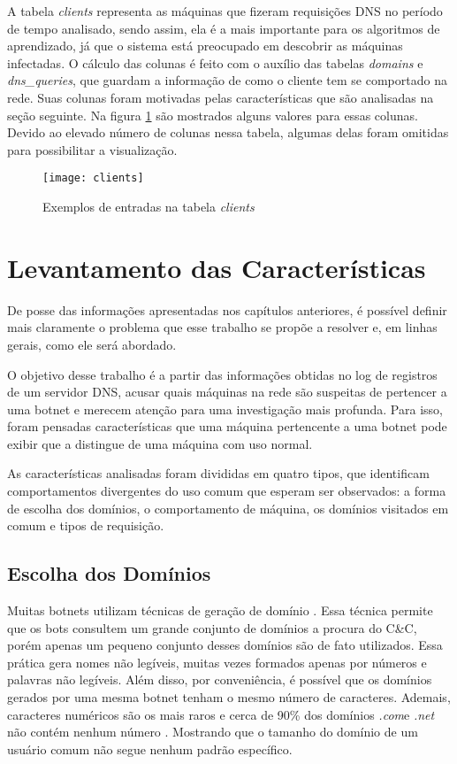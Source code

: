 A tabela \textit{clients} representa as máquinas que fizeram requisições DNS no período de tempo analisado, sendo assim, ela é a mais importante para os algoritmos de aprendizado, já que o sistema está preocupado em descobrir as máquinas infectadas. O cálculo das colunas é feito com o auxílio das tabelas \textit{domains} e \textit{dns\_queries}, que guardam a informação de como o cliente tem se comportado na rede. Suas colunas foram motivadas pelas características que são analisadas na seção seguinte. Na figura \ref{fig:clients} são mostrados alguns valores para essas colunas. Devido ao elevado número de colunas nessa tabela, algumas delas foram omitidas para possibilitar a visualização.

\begin{figure}
\texttt{[image: clients]}
\caption[Exemplos de entradas na tabela \textit{clients}]{Exemplos de entradas na tabela \textit{clients}} \label{fig:clients}
\end{figure}

\section{Levantamento das Características}
\label{sec:levantamento_das_caracteristicas}
De posse das informações apresentadas nos capítulos anteriores, é possível definir mais claramente o problema que esse trabalho se propõe a resolver e, em linhas gerais, como ele será abordado.

O objetivo desse trabalho é a partir das informações obtidas no log de registros de um servidor DNS, acusar quais máquinas na rede são suspeitas de pertencer a uma botnet e merecem atenção para uma investigação mais profunda. Para isso, foram pensadas características que uma máquina pertencente a uma botnet pode exibir que a distingue de uma máquina com uso normal.

As características analisadas foram divididas em quatro tipos, que identificam comportamentos divergentes do uso comum que esperam ser observados: a forma de escolha dos domínios, o comportamento de máquina, os domínios visitados em comum e tipos de requisição.

\subsection{Escolha dos Domínios}
Muitas botnets utilizam técnicas de geração de domínio \citep{zhou2013dga}. Essa técnica permite que os bots consultem um grande conjunto de domínios a procura do C\&C, porém apenas um pequeno conjunto desses domínios são de fato utilizados. Essa prática gera nomes não legíveis, muitas vezes formados apenas por números e palavras não legíveis. Além disso, por conveniência, é possível que os domínios gerados por uma mesma botnet tenham o mesmo número de caracteres. Ademais, caracteres numéricos são os mais raros e cerca de 90\% dos domínios \textit{.com}e \textit{.net} não contém nenhum número \cite{data2016domain}. Mostrando que o tamanho do domínio de um usuário comum não segue nenhum padrão específico.

